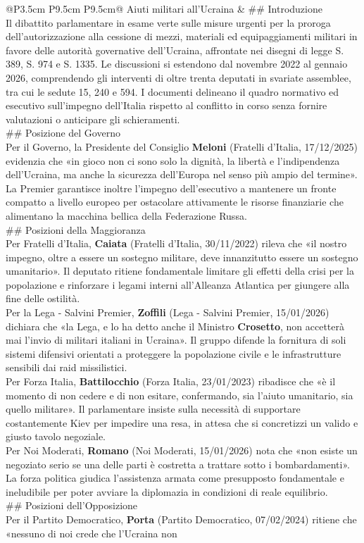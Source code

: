 \documentclass[a4paper,11pt]{article}
\begin{document}
\begin{landscape}
\begin{longtable}{@{}P{3.5cm} P{9.5cm} P{9.5cm}@{}}
Aiuti militari all'Ucraina & \#\# Introduzione\\[6pt] Il dibattito parlamentare in esame verte sulle misure urgenti per la proroga dell'autorizzazione alla cessione di mezzi, materiali ed equipaggiamenti militari in favore delle autorità governative dell'Ucraina, affrontate nei disegni di legge S. 389, S. 974 e S. 1335. Le discussioni si estendono dal novembre 2022 al gennaio 2026, comprendendo gli interventi di oltre trenta deputati in svariate assemblee, tra cui le sedute 15, 240 e 594. I documenti delineano il quadro normativo ed esecutivo sull'impegno dell'Italia rispetto al conflitto in corso senza fornire valutazioni o anticipare gli schieramenti.\\[6pt] \#\# Posizione del Governo\\[6pt] Per il Governo, la Presidente del Consiglio \textbf{Meloni} (Fratelli d'Italia, 17/12/2025) evidenzia che «in gioco non ci sono solo la dignità, la libertà e l'indipendenza dell'Ucraina, ma anche la sicurezza dell'Europa nel senso più ampio del termine». La Premier garantisce inoltre l'impegno dell'esecutivo a mantenere un fronte compatto a livello europeo per ostacolare attivamente le risorse finanziarie che alimentano la macchina bellica della Federazione Russa.\\[6pt] \#\# Posizioni della Maggioranza\\[6pt] Per Fratelli d'Italia, \textbf{Caiata} (Fratelli d'Italia, 30/11/2022) rileva che «il nostro impegno, oltre a essere un sostegno militare, deve innanzitutto essere un sostegno umanitario». Il deputato ritiene fondamentale limitare gli effetti della crisi per la popolazione e rinforzare i legami interni all'Alleanza Atlantica per giungere alla fine delle ostilità.\\[6pt] Per la Lega - Salvini Premier, \textbf{Zoffili} (Lega - Salvini Premier, 15/01/2026) dichiara che «la Lega, e lo ha detto anche il Ministro \textbf{Crosetto}, non accetterà mai l'invio di militari italiani in Ucraina». Il gruppo difende la fornitura di soli sistemi difensivi orientati a proteggere la popolazione civile e le infrastrutture sensibili dai raid missilistici.\\[6pt] Per Forza Italia, \textbf{Battilocchio} (Forza Italia, 23/01/2023) ribadisce che «è il momento di non cedere e di non esitare, confermando, sia l'aiuto umanitario, sia quello militare». Il parlamentare insiste sulla necessità di supportare costantemente Kiev per impedire una resa, in attesa che si concretizzi un valido e giusto tavolo negoziale.\\[6pt] Per Noi Moderati, \textbf{Romano} (Noi Moderati, 15/01/2026) nota che «non esiste un negoziato serio se una delle parti è costretta a trattare sotto i bombardamenti». La forza politica giudica l'assistenza armata come presupposto fondamentale e ineludibile per poter avviare la diplomazia in condizioni di reale equilibrio.\\[6pt] \#\# Posizioni dell'Opposizione\\[6pt] Per il Partito Democratico, \textbf{Porta} (Partito Democratico, 07/02/2024) ritiene che «nessuno di noi crede che l'Ucraina non 
\end{longtable}
\end{landscape}
\end{document}
